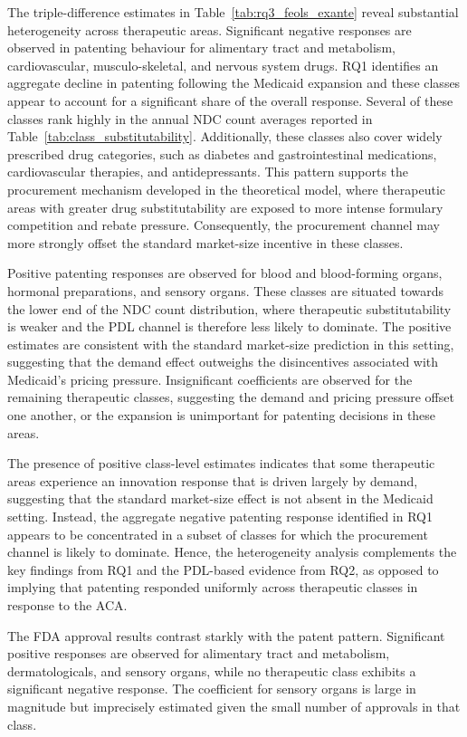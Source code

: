 \documentclass[12pt]{article}
\begin{document}
The triple-difference estimates in Table~\ref{tab:rq3_feols_exante} reveal substantial heterogeneity across therapeutic areas. Significant negative responses are observed in patenting behaviour for alimentary tract and metabolism, cardiovascular, musculo-skeletal, and nervous system drugs. RQ1 identifies an aggregate decline in patenting following the Medicaid expansion and these classes appear to account for a significant share of the overall response. Several of these classes rank highly in the annual NDC count averages reported in Table~\ref{tab:class_substitutability}. Additionally, these classes also cover widely prescribed drug categories, such as diabetes and gastrointestinal medications, cardiovascular therapies, and antidepressants. This pattern supports the procurement mechanism developed in the theoretical model, where therapeutic areas with greater drug substitutability are exposed to more intense formulary competition and rebate pressure. Consequently, the procurement channel may more strongly offset the standard market-size incentive in these classes.

Positive patenting responses are observed for blood and blood-forming organs, hormonal preparations, and sensory organs. These classes are situated towards the lower end of the NDC count distribution, where therapeutic substitutability is weaker and the PDL channel is therefore less likely to dominate. The positive estimates are consistent with the standard market-size prediction in this setting, suggesting that the demand effect outweighs the disincentives associated with Medicaid's pricing pressure. Insignificant coefficients are observed for the remaining therapeutic classes, suggesting the demand and pricing pressure offset one another, or the expansion is unimportant for patenting decisions in these areas.

The presence of positive class-level estimates indicates that some therapeutic areas experience an innovation response that is driven largely by demand, suggesting that the standard market-size effect is not absent in the Medicaid setting. Instead, the aggregate negative patenting response identified in RQ1 appears to be concentrated in a subset of classes for which the procurement channel is likely to dominate. Hence, the heterogeneity analysis complements the key findings from RQ1 and the PDL-based evidence from RQ2, as opposed to implying that patenting responded uniformly across therapeutic classes in response to the ACA.

The FDA approval results contrast starkly with the patent pattern. Significant positive responses are observed for alimentary tract and metabolism, dermatologicals, and sensory organs, while no therapeutic class exhibits a significant negative response. The coefficient for sensory organs is large in magnitude but imprecisely estimated given the small number of approvals in that class.
\end{document}
